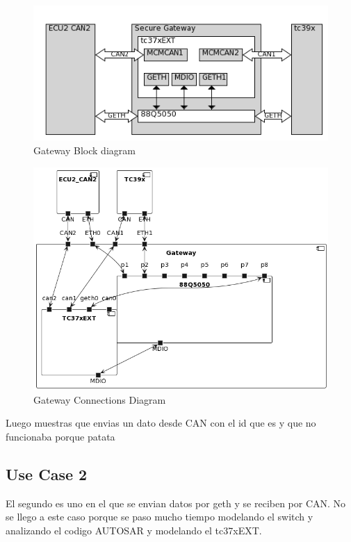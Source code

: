 \begin{figure}[!htb]
 \centering
 \includegraphics[width=\textwidth]{img/gateway_block_diagram.png}
 \caption{Gateway Block diagram}
 \label{fig:block diagram}
\end{figure}

\begin{figure}[!htb]
 \centering
 \includegraphics[width=\textwidth]{img/GWConnectionsDiagram.png}
 \caption{Gateway Connections Diagram}
 \label{fig:connections-diagram}
\end{figure}


Luego muestras que envias un dato desde CAN con el id que es y que no funcionaba porque patata

\subsection{Use Case 2}

El segundo es uno en el que se envian datos por geth y se reciben por CAN.
No se llego a este caso porque se paso mucho tiempo modelando el switch y analizando el codigo AUTOSAR y modelando el tc37xEXT.
